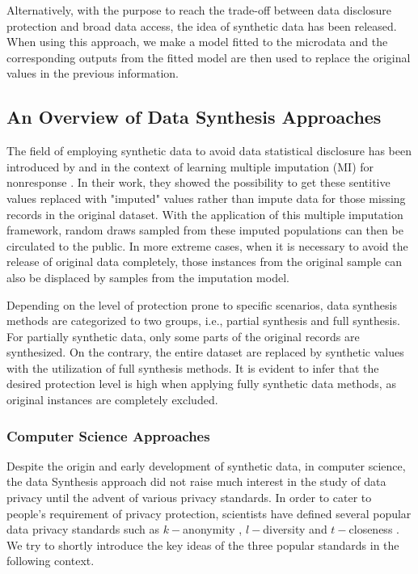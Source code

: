 Alternatively, with the purpose to reach the trade-off between data disclosure protection and broad
data access, the idea of synthetic data has been released. When using this approach, we make a model
fitted to the microdata and the corresponding outputs from the fitted model are then used to replace
the original values in the previous information.


\subsection{An Overview of Data Synthesis Approaches}
\label{subsec:datasynthesis}
The field of employing synthetic data to avoid data statistical disclosure has been introduced by \citet{rubin1993statistical}
and \citet{little1993statistical} in the context of learning multiple imputation (MI) for nonresponse \citep{little2019statistical}.
In their work, they showed the possibility to get these sentitive values replaced with "imputed" values
rather than impute data for those missing records in the original dataset. With the application of this multiple
imputation framework, random draws sampled from these imputed populations can then be circulated to the public. In more
extreme cases, when it is necessary to avoid the release of original data completely, those instances from
the original sample can also be displaced by samples from the imputation model.

Depending on the level of protection prone to specific scenarios, data synthesis methods are categorized to two groups, i.e.,
partial synthesis and full synthesis. For partially synthetic data, only some parts of the original records are synthesized. 
On the contrary, the entire dataset are replaced by synthetic values with the utilization of full synthesis methods.
It is evident to infer that the desired protection level is high when applying fully synthetic data methods, as original instances
are completely excluded. 



\subsubsection{Computer Science Approaches}
\label{subsubsec:csapproach}
Despite the origin and early development of synthetic data, in computer science, the data Synthesis
approach did not raise much interest in the study of data privacy until the advent of various privacy
standards. In order to cater to people's requirement of privacy protection, scientists have defined
several popular data privacy standards such as $k-$anonymity \citep{sweeney2002k}, $l-$diversity \citep{machanavajjhala2007diversity}
and $t-$closeness \citep{li2006t}. We try to shortly introduce the key ideas of the three popular
standards in the following context. 

